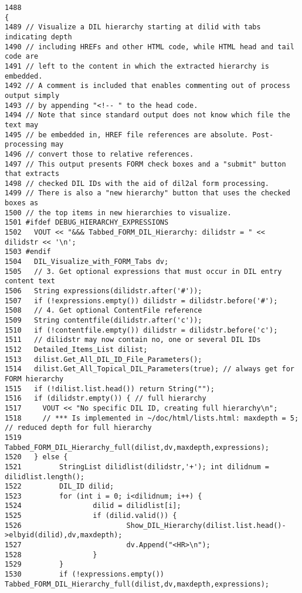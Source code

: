 \footnotesize\begin{verbatim}1488                                                                      {
1489 // Visualize a DIL hierarchy starting at dilid with tabs indicating depth
1490 // including HREFs and other HTML code, while HTML head and tail code are
1491 // left to the content in which the extracted hierarchy is embedded.
1492 // A comment is included that enables commenting out of process output simply
1493 // by appending "<!-- " to the head code.
1494 // Note that since standard output does not know which file the text may
1495 // be embedded in, HREF file references are absolute. Post-processing may
1496 // convert those to relative references.
1497 // This output presents FORM check boxes and a "submit" button that extracts
1498 // checked DIL IDs with the aid of dil2al form processing.
1499 // There is also a "new hierarchy" button that uses the checked boxes as
1500 // the top items in new hierarchies to visualize.
1501 #ifdef DEBUG_HIERARCHY_EXPRESSIONS
1502   VOUT << "&&& Tabbed_FORM_DIL_Hierarchy: dilidstr = " << dilidstr << '\n';
1503 #endif
1504   DIL_Visualize_with_FORM_Tabs dv;
1505   // 3. Get optional expressions that must occur in DIL entry content text
1506   String expressions(dilidstr.after('#'));
1507   if (!expressions.empty()) dilidstr = dilidstr.before('#');
1508   // 4. Get optional ContentFile reference
1509   String contentfile(dilidstr.after('c'));
1510   if (!contentfile.empty()) dilidstr = dilidstr.before('c');
1511   // dilidstr may now contain no, one or several DIL IDs
1512   Detailed_Items_List dilist;
1513   dilist.Get_All_DIL_ID_File_Parameters();
1514   dilist.Get_All_Topical_DIL_Parameters(true); // always get for FORM hierarchy
1515   if (!dilist.list.head()) return String("");
1516   if (dilidstr.empty()) { // full hierarchy
1517     VOUT << "No specific DIL ID, creating full hierarchy\n";
1518     // *** Is implemented in ~/doc/html/lists.html: maxdepth = 5; // reduced depth for full hierarchy
1519     Tabbed_FORM_DIL_Hierarchy_full(dilist,dv,maxdepth,expressions);
1520   } else {
1521         StringList dilidlist(dilidstr,'+'); int dilidnum = dilidlist.length();
1522         DIL_ID dilid;
1523         for (int i = 0; i<dilidnum; i++) {
1524                 dilid = dilidlist[i];
1525                 if (dilid.valid()) {
1526                         Show_DIL_Hierarchy(dilist.list.head()->elbyid(dilid),dv,maxdepth);
1527                         dv.Append("<HR>\n");
1528                 }
1529         }
1530         if (!expressions.empty()) Tabbed_FORM_DIL_Hierarchy_full(dilist,dv,maxdepth,expressions);

\end{verbatim}

